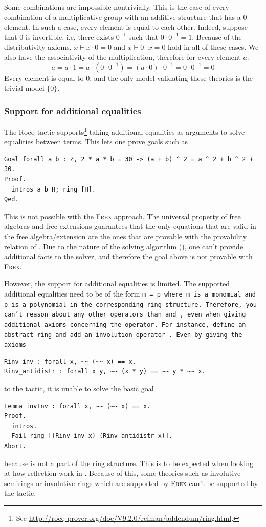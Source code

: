 Some combinations are impossible nontrivially. This is the case of every combination of a multiplicative group with an additive structure that has a $0$ element. In such a case, every element is equal to each other. Indeed, suppose that $0$ is invertible, i.e, there exists $0^{-1}$ such that $0 \cdot 0^{-1} = 1$. Because of the distributivity axioms, $x \vdash x \cdot 0 = 0$ and $x \vdash 0 \cdot x = 0$ hold in all of these cases. We also have the associativity of the multiplication, therefore for every element $a$: $$a = a \cdot 1 = a \cdot (0 \cdot 0^{-1}) = (a \cdot 0) \cdot 0^{-1} = 0 \cdot 0^{-1} = 0$$ Every element is equal to $0$, and the only model validating these theories is the trivial model $\{0\}$.

\subsubsection{Support for additional equalities}
\label{sec:additional_equalities}

The Rocq \ring tactic supports\footnote{See \url{http://rocq-prover.org/doc/V9.2.0/refman/addendum/ring.html}.} taking additional equalities as arguments to solve equalities between terms. This lets one prove goals such as \begin{verbatim}
Goal forall a b : Z, 2 * a * b = 30 -> (a + b) ^ 2 = a ^ 2 + b ^ 2 + 30.
Proof.
  intros a b H; ring [H].
Qed.
\end{verbatim}
This is not possible with the \textsc{Frex} approach. The universal property of free algebras and free extensions guarantees that the only equations that are valid in the free algebra/extension are the ones that are provable with the provability relation of . Due to the nature of the solving algorithm (), one can't provide additional facts to the solver, and therefore the goal above is not provable with \textsc{Frex}.

However, the support for additional equalities is limited. The supported additional equalities need to be of the form \tt{m = p} where \tt{m} is a monomial and \tt{p} is a polynomial in the corresponding ring structure. Therefore, you can't reason about any other operators than \coqinline{+} and \coqinline{*}, even when giving additional axioms concerning the operator.
For instance, define an abstract ring and add an involution operator \coqinline{~~}. Even by giving the axioms
  \begin{verbatim}
Rinv_inv : forall x, ~~ (~~ x) == x.
Rinv_antidistr : forall x y, ~~ (x * y) == ~~ y * ~~ x.
  \end{verbatim}
to the \ring tactic, it is unable to solve the basic goal
  \begin{verbatim}
Lemma invInv : forall x, ~~ (~~ x) == x.
Proof.
  intros.
  Fail ring [(Rinv_inv x) (Rinv_antidistr x)].
Abort.
  \end{verbatim}
because \coqinline{~~} is not a part of the ring structure. This is to be expected when looking at how reflection work in . Because of this, some theories such as involutive semirings or involutive rings which are supported by \textsc{Frex} can't be supported by the \ring tactic.

